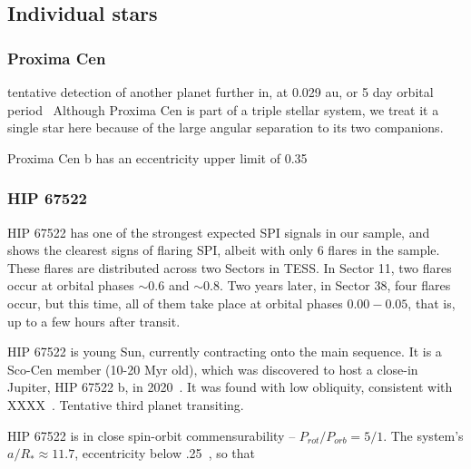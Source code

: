 \documentclass[twocolumn]{aastex631}
\begin{document}

\subsection{Individual stars}

\subsubsection{Proxima Cen}
tentative detection of another planet further in, at 0.029 au, or 5 day orbital period~\citep{faria2022candidate, artigau2022linebyline}
Although Proxima Cen is part of a triple stellar system, we treat it a single star here because of the large angular separation to its two companions.

Proxima Cen b has an eccentricity upper limit of 0.35~\cite{anglada-escude2016terrestrial}

\subsubsection{HIP 67522}
HIP 67522 has one of the strongest expected SPI signals in our sample, and shows the clearest signs of flaring SPI, albeit with only 6 flares in the sample. These flares are distributed across two Sectors in TESS. In Sector 11, two flares occur at orbital phases $\sim 0.6$ and $\sim 0.8$. Two years later, in Sector 38, four flares occur, but this time, all of them take place at orbital phases $0.00-0.05$, that is, up to a few hours after transit.

HIP 67522 is young Sun, currently contracting onto the main sequence. It is a Sco-Cen member (10-20 Myr old), which was discovered to host a close-in Jupiter, HIP 67522 b, in 2020~\citep{rizzuto2020tess}. It was found with low obliquity, consistent with XXXX~\citep{heitzmann2021obliquity}. Tentative third planet transiting.

HIP 67522 is in close spin-orbit commensurability -- $P_{rot}/P_{orb}=5/1$. The system's $a/R_*\approx11.7$, eccentricity below .25~\cite{rizzuto2020tess}, so that  
\end{document}
